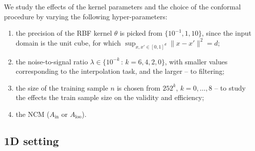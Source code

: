 \documentclass{ITaSconf}
\begin{document}
We study the effects of the kernel parameters and the choice of the conformal procedure
by varying the following hyper-parameters: \begin{enumerate}
  \item the precision of the RBF kernel $\theta$ is picked from $\{10^{-1}, 1, 10\}$,
  since the input domain is the unit cube, for which $\sup_{x,x'\in[0,1]^d}\|x-x'\|^2 = d$;
  \item the noise-to-signal ratio $\lambda \in\{10^{-k}\,:\,k=6, 4, 2, 0\}$, with
  smaller values corresponding to the interpolation task, and the larger -- to filtering;
  \item the size of the training sample $n$ is chosen from $25 2^k$, $k=0,\ldots, 8$ --
  to study the effects the train sample size on the validity and efficiency;
  \item the NCM ($A_{\text{in}}$ or $A_{\text{loo}}$).
\end{enumerate}


\subsection{1D setting} %
\label{sub:1d_setting}
\end{document}
